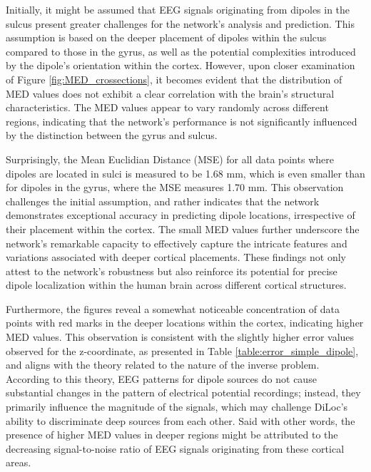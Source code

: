 \documentclass[a4paper, UKenglish, 11pt]{uiomaster}
\begin{document}
Initially, it might be assumed that EEG signals originating from dipoles in the sulcus present greater challenges for the network's analysis and prediction. This assumption is based on the deeper placement of dipoles within the sulcus compared to those in the gyrus, as well as the potential complexities introduced by the dipole's orientation within the cortex. However, upon closer examination of Figure \ref{fig:MED_crossections}, it becomes evident that the distribution of MED values does not exhibit a clear correlation with the brain's structural characteristics. The MED values appear to vary randomly across different regions, indicating that the network's performance is not significantly influenced by the distinction between the gyrus and sulcus.

Surprisingly, the Mean Euclidian Distance (MSE) for all data points where dipoles are located in sulci is measured to be 1.68 mm, which is even smaller than for dipoles in the gyrus, where the MSE measures 1.70 mm. This observation challenges the initial assumption, and rather indicates that the network demonstrates exceptional accuracy in predicting dipole locations, irrespective of their placement within the cortex. The small MED values further underscore the network's remarkable capacity to effectively capture the intricate features and variations associated with deeper cortical placements. These findings not only attest to the network's robustness but also reinforce its potential for precise dipole localization within the human brain across different cortical structures.

Furthermore, the figures reveal a somewhat noticeable concentration of data points with red marks in the deeper locations within the cortex, indicating higher MED values. This observation is consistent with the slightly higher error values observed for the z-coordinate, as presented in Table \ref{table:error_simple_dipole}, and aligns with the theory related to the nature of the inverse problem. According to this theory, EEG patterns for dipole sources do not cause substantial changes in the pattern of electrical potential recordings; instead, they primarily influence the magnitude of the signals, which may challenge DiLoc's ability to discriminate deep sources from each other. Said with other words, the presence of higher MED values in deeper regions might be attributed to the decreasing signal-to-noise ratio of EEG signals originating from these cortical areas.
\end{document}
